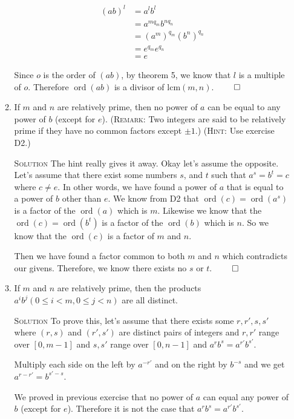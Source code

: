 \documentclass[twoside]{amsart}
\newcommand{\solution}{\textsc{Solution}\xspace}
\newcommand{\blank}{\vspace{5pt}}
\newcommand{\itm}{\blank\item}
\newcommand{\sol}{\blank\noindent\solution}
\newcommand{\ord}{\mathop{\mathrm{ord}}}
\begin{document}
\begin{enumerate}[A.]
\begin{enumerate}[1]
      \begin{align*}
         (ab)^l &= a^l b^l \\
                &= a^{mq_m} b^{nq_n} \\
                &= (a^m)^{q_m} (b^n)^{q_n} \\
                &= e^{q_m} e^{q_n} \\
                &= e
      \end{align*}

      Since $o$ is the order of $(ab)$, by theorem 5, we know that $l$ is
      a multiple of $o$. Therefore $\ord(ab)$ is a divisor of $\mathrm{lcm}
      (m,n)$. $\qed$

      \itm If $m$ and $n$ are relatively prime, then no power of $a$
      can be equal to any power of $b$ (except for $e$). (\textsc{Remark}: Two
      integers are said to be relatively prime if they have no common factors
      except $\pm 1$.) (\textsc{Hint}: Use exercise D2.)

      \sol The hint really gives it away. Okay let's assume the opposite.
      Let's assume that there exist some numbers $s$, and $t$ such
      that $a^s = b^t = c$ where $c \ne e$. In other words, we have found a
      power of $a$ that is equal to a power of $b$ other than $e$. 
      We know from D2 that
      $\ord(c) = \ord(a^s)$ is a factor of the $\ord(a)$ which is $m$.
      Likewise we know that the $\ord(c) = \ord(b^t)$ is a factor
      of the $\ord(b)$ which is $n$. So we know that the
      $\ord(c)$ is a factor of $m$ and $n$. 

      Then we have found a factor common to both $m$ and $n$ which 
      contradicts our givens. Therefore, we know there exists no $s$ or
      $t$. $\qed$

      \itm If $m$ and $n$ are relatively prime, then the products 
      $a^ib^j (0 \le i < m, 0 \le j < n)$ are all distinct.

      \sol To prove this, let's assume that there exists some $r,r',s,s'$ 
      where $(r,s)$ and $(r',s')$ are distinct pairs of integers 
      and $r, r'$ range over $[0,m-1]$ and
      $s,s'$ range over $[0,n-1]$ and $a^rb^s = a^{r'} b^{s'}$.

      \blank
      Multiply each side on the left by $a^{-r'}$ and on the right by
      $b^{-s}$ and we get $a^{r-r'} = b^{s'-s}$.

      We proved in previous exercise that no power of $a$ can equal
      any power of $b$ (except for $e$).  Therefore it is not the case
      that $a^rb^s = a^{r'} b^{s'}$.


\end{enumerate}
\end{enumerate}
\end{document}
